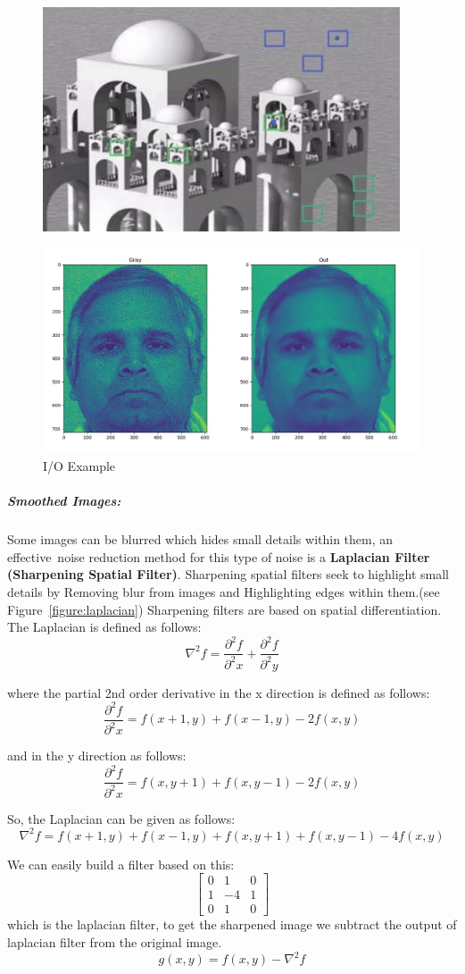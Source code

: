 \begin{figure}[H]
	\centering
	\includegraphics[width=.5\linewidth]{images/nlmd.jpg}
\end{figure}

\begin{figure}[H]
	\centering
	\includegraphics[width=.5\linewidth]{images/gaussian.jpg}
	\caption{I/O Example}
	\label{fig:Gnoise}
\end{figure}

\subparagraph{Smoothed Images:}
Some images can be blurred which hides small details within them, an effective noise reduction method for this type of noise is a \textbf{Laplacian Filter (Sharpening Spatial Filter)}.\newline
Sharpening spatial filters seek to highlight small details by Removing blur from images and Highlighting edges within them.(see Figure~\ref{figure:laplacian})\newline
Sharpening filters are based on spatial differentiation.\newline
The Laplacian is defined as follows:
\[\nabla^{2} f = \frac{\partial^{2}f}{\partial^{2}x} + \frac{\partial^{2}f}{\partial^{2}y}\]

where the partial 2nd order derivative in the x direction is defined as follows:
\[\frac{\partial^{2}f}{\partial^{2}x} = f(x+1, y) + f(x-1, y) - 2f(x, y)\]

and in the y direction as follows:
\[\frac{\partial^{2}f}{\partial^{2}x} = f(x, y+1) + f(x, y-1) - 2f(x, y)\]

So, the Laplacian can be given as follows:
\[\nabla^{2} f = f(x+1, y) + f(x-1, y) + f(x, y+1) + f(x, y-1) - 4f(x, y)\]

We can easily build a filter based on this:
\[
\begin{bmatrix}
0 & 1 & 0 \\
1 & -4 & 1 \\
0 & 1 & 0
\end{bmatrix} \]
which is the laplacian filter, to get the sharpened image we subtract the output of laplacian filter from the original image.
\[g(x, y) = f(x, y) - \nabla^{2} f\]

